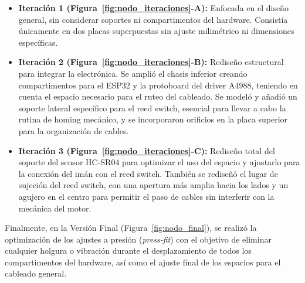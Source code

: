 \begin{itemize}[topsep=4pt, partopsep=0pt, itemsep=2pt, parsep=0pt]
    \item \textbf{Iteración 1 (Figura~\ref{fig:nodo_iteraciones}-A):} Enfocada en el diseño general, sin considerar soportes ni compartimentos del hardware. Consistía únicamente en dos placas superpuestas sin ajuste milimétrico ni dimensiones específicas.
    \item \textbf{Iteración 2 (Figura~\ref{fig:nodo_iteraciones}-B):} Rediseño estructural para integrar la electrónica. Se amplió el chasis inferior creando compartimentos para el ESP32 y la protoboard del driver A4988, teniendo en cuenta el espacio necesario para el ruteo del cableado. Se modeló y añadió un soporte lateral específico para el reed switch, esencial para llevar a cabo la rutina de homing mecánico, y se incorporaron orificios en la placa superior para la organización de cables.
    \item \textbf{Iteración 3 (Figura~\ref{fig:nodo_iteraciones}-C):} Rediseño total del soporte del sensor HC-SR04 para optimizar el uso del espacio y ajustarlo para la conexión del imán con el reed switch. También se rediseñó el lugar de sujeción del reed switch, con una apertura más amplia hacia los lados y un agujero en el centro para permitir el paso de cables sin interferir con la mecánica del motor.
\end{itemize}


Finalmente, en la Versión Final (Figura~\ref{fig:nodo_final}), se realizó la optimización de los ajustes a presión (\textit{press-fit}) con el objetivo de eliminar cualquier holgura o vibración durante el desplazamiento de todos los compartimentos del hardware, así como el ajuste final de los espacios para el cableado general.


